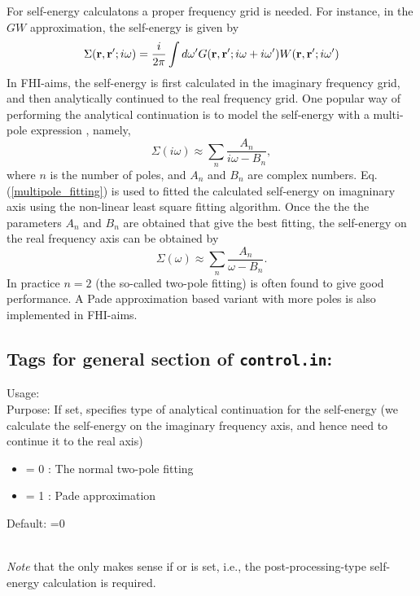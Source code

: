 For self-energy calculatons a proper frequency grid is needed. For instance,
in the $GW$ approximation, the self-energy is given by
  \begin{equation}
    \Sigma({\bf r, r^\prime};i\omega) = \frac{i}{2\pi} \int d\omega^\prime
     G({\bf r, r^{\prime}};i\omega+i\omega^\prime) 
    W({\bf r,r^\prime};i\omega^\prime)
   \label{GW_selfenergy}
  \end{equation}
In FHI-aims, the self-energy is first calculated in the imaginary frequency
grid, and then analytically continued to the real frequency grid. One popular 
way of performing the analytical continuation is to model the self-energy with
a multi-pole expression \cite{Rojas95}, namely,
    \begin{equation}
       \Sigma(i\omega) \approx \sum_n \frac{A_n}{i\omega - B_n},
      \label{multipole_fitting}
    \end{equation}
where $n$ is the number of poles, and $A_n$ and $B_n$ are complex numbers. 
Eq. (\ref{multipole_fitting}) is used to fitted the calculated self-energy
on imagninary axis using the non-linear least square fitting algorithm. Once the
the the parameters $A_n$ and $B_n$ are obtained that give the best fitting,
the self-energy on the real frequency axis can be obtained by
    \begin{equation}
       \Sigma(\omega) \approx \sum_n \frac{A_n}{\omega - B_n}.
    \end{equation}
In practice $n=2$ (the so-called two-pole fitting) is often found to
give good performance. A Pade approximation based variant with more
poles is also implemented in FHI-aims.


\newpage

\subsection*{Tags for general section of \texttt{control.in}:}

{ \noindent
  Usage:   \\[1.0ex]
  Purpose: If set, specifies type of analytical continuation for the self-energy
  (we calculate the self-energy on the imaginary frequency axis, and
   hence need to continue it to the real axis)  
  \begin{itemize}
     \item {} = 0 : The normal two-pole fitting  
    \item {} = 1 : Pade approximation
  \end{itemize}
  Default: =0
}\\[1.0ex]
\emph{Note} that the  only makes sense if 
 or  is set, i.e., the
post-processing-type self-energy calculation is required.


